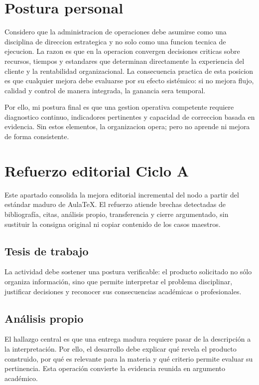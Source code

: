 \documentclass[
	spanish,
	letterpaper, oneside
]{article}
\begin{document}
\section{Postura personal}

Considero que la administracion de operaciones debe asumirse como una disciplina de direccion estrategica y no solo como una funcion tecnica de ejecucion. La razon es que en la operacion convergen decisiones criticas sobre recursos, tiempos y estandares que determinan directamente la experiencia del cliente y la rentabilidad organizacional. La consecuencia practica de esta posicion es que cualquier mejora debe evaluarse por su efecto sistémico: si no mejora flujo, calidad y control de manera integrada, la ganancia sera temporal.

Por ello, mi postura final es que una gestion operativa competente requiere diagnostico continuo, indicadores pertinentes y capacidad de correccion basada en evidencia. Sin estos elementos, la organizacion opera; pero no aprende ni mejora de forma consistente.

\section*{Refuerzo editorial Ciclo A}
Este apartado consolida la mejora editorial incremental del nodo a partir del estándar maduro de AulaTeX. El refuerzo atiende brechas detectadas de bibliografía, citas, análisis propio, transferencia y cierre argumentado, sin sustituir la consigna original ni copiar contenido de los casos maestros.

\subsection*{Tesis de trabajo}
La actividad debe sostener una postura verificable: el producto solicitado no sólo organiza información, sino que permite interpretar el problema disciplinar, justificar decisiones y reconocer sus consecuencias académicas o profesionales.

\subsection*{Análisis propio}
El hallazgo central es que una entrega madura requiere pasar de la descripción a la interpretación. Por ello, el desarrollo debe explicar qué revela el producto construido, por qué es relevante para la materia y qué criterio permite evaluar su pertinencia. Esta operación convierte la evidencia reunida en argumento académico.
\end{document}
